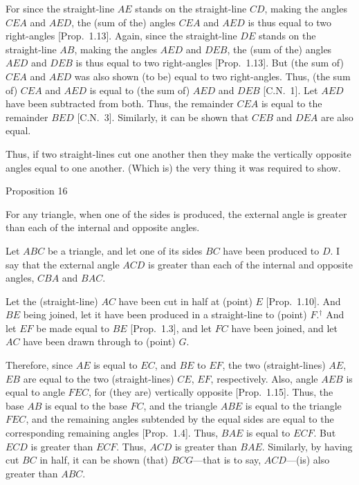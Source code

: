 \epsfysize=2.3in
\centerline{}

For since the straight-line $AE$ stands on the straight-line $CD$, making the
angles $CEA$ and $AED$, the (sum of the) angles $CEA$ and $AED$ is thus equal to two
right-angles [Prop.~1.13]. Again, since the straight-line $DE$ stands on the
straight-line $AB$, making the angles $AED$ and $DEB$, the (sum of the) angles $AED$ and
$DEB$ is thus equal to two right-angles [Prop.~1.13]. But (the sum of) $CEA$ and $AED$ was also shown
(to be) equal to two right-angles. Thus, (the sum of) $CEA$ and $AED$ is equal to (the sum of) $AED$ and $DEB$ [C.N.~1]. Let $AED$ have been subtracted from both. Thus, the remainder
$CEA$ is equal to the remainder $BED$ [C.N.~3]. Similarly, it can be shown that
$CEB$ and $DEA$ are also equal.

Thus, if two straight-lines cut one another then they make the vertically opposite angles
equal to one another. (Which is) the very thing it was required to show.


\begin{center}
{\large Proposition 16}
\end{center}

For any triangle, when one of the sides is produced, the external angle
is greater than each of the internal and opposite angles.

Let $ABC$ be a triangle, and let one of its sides $BC$ have been produced 
 to $D$. I say that the external angle $ACD$ is greater than each of the
 internal and opposite angles, $CBA$ and $BAC$.
 
 Let the (straight-line) $AC$ have been cut in half at (point) $E$ [Prop.~1.10].
 And $BE$ being joined, let it have been produced in a straight-line to
 (point) $F$.$^\dag$ And let $EF$ be made equal to $BE$ [Prop.~1.3], and let $FC$ have been joined, and let $AC$ have been drawn through to (point) $G$.

 Therefore, since $AE$ is equal to $EC$, and $BE$ to $EF$, the two (straight-lines)
 $AE$, $EB$ are equal to the two (straight-lines) $CE$, $EF$, respectively. 
 Also, angle $AEB$ is equal to angle $FEC$, for (they are)
 vertically opposite [Prop.~1.15]. Thus, the base $AB$ is equal to the base
 $FC$, and the triangle $ABE$ is equal to the triangle $FEC$, and the remaining
 angles subtended by the equal sides are equal to the corresponding remaining angles [Prop.~1.4]. Thus, $BAE$ is equal to $ECF$. But $ECD$ is greater than $ECF$. Thus,
 $ACD$ is greater than $BAE$. Similarly, by having cut $BC$ in half,  it can  be shown (that) $BCG$---that is to say, $ACD$---(is) also greater than $ABC$.
 
